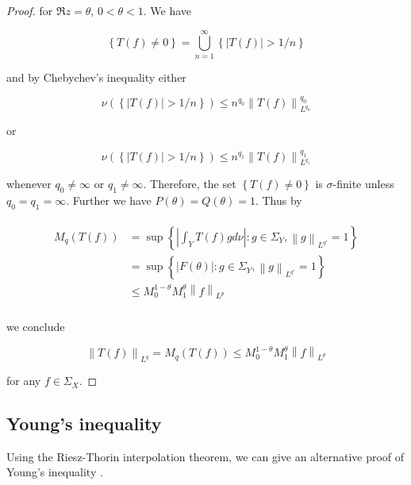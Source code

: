 \begin{proof}
for $\Re z = \theta$, $0 < \theta < 1$. We have

\begin{equation*}
	\left\{ T(f) \neq 0\right\} = \bigcup_{n = 1}^\infty \left\{ \left| T(f)\right| > 1/n\right\}
\end{equation*}

and by Chebychev's inequality either

\begin{equation*}
	\nu\left( \left\{ \left| T(f)\right| > 1/n\right\} \right) \leqslant n^{q_0}\left\| T(f)\right\|_{L^{q_0}}^{q_0}
\end{equation*}

or

\begin{equation*}
	\nu\left( \left\{ \left| T(f)\right| > 1/n\right\} \right) \leqslant n^{q_1}\left\| T(f)\right\|_{L^{q_1}}^{q_1}
\end{equation*}

whenever $q_0 \neq \infty$ or $q_1 \neq \infty$. Therefore, the set $\left\{ T(f) \neq 0\right\}$ is $\sigma$-finite unless $q_0 = q_1 = \infty$. Further we have $P(\theta) = Q(\theta) = 1$. Thus by

\begin{gather*}
	\begin{aligned}
		M_q\left( T(f) \right) &= \sup\left\{\left| \int_Y T(f)gd\nu\right| : g \in \Sigma_Y, \left\|g\right\|_{L^{q'}} = 1\right\}\\
		&=  \sup\left\{\left| F(\theta)\right| : g \in \Sigma_Y, \left\|g\right\|_{L^{q'}} = 1\right\}\\
		&\leqslant M_0^{1 - \theta}M_1^\theta \left\|f\right\|_{L^p}\\
	\end{aligned}
\end{gather*}

we conclude 
	
\begin{equation*}
	\left\| T(f)\right\|_{L^q} = M_q\left( T(f) \right) \leqslant M_0^{1 - \theta}M_1^\theta \left\|f\right\|_{L^p}
\end{equation*}
	
for any $f \in \Sigma_X$.
\end{proof}

\subsection{Young's inequality}
Using the Riesz-Thorin interpolation theorem, we can give an alternative proof of Young's inequality \cite[22--23]{grafakos:fourier:2014}.

